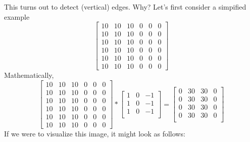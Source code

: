 \documentclass[12pt]{article}
\begin{document}
This turns out to detect (vertical) edges. Why? Let's first consider a simpified example
\begin{equation*}   \begin{bmatrix}
 10 & 10 & 10 & 0 & 0 & 0 \\
 10 & 10 & 10 & 0 & 0 & 0 \\
 10 & 10 & 10 & 0 & 0 & 0 \\
 10 & 10 & 10 & 0 & 0 & 0 \\
 10 & 10 & 10 & 0 & 0 & 0 \\
 10 & 10 & 10 & 0 & 0 & 0
  \end{bmatrix} \end{equation*}
Mathematically,
\begin{equation*}   \begin{bmatrix}
 10 & 10 & 10 & 0 & 0 & 0 \\
 10 & 10 & 10 & 0 & 0 & 0 \\
 10 & 10 & 10 & 0 & 0 & 0 \\
 10 & 10 & 10 & 0 & 0 & 0 \\
 10 & 10 & 10 & 0 & 0 & 0 \\
 10 & 10 & 10 & 0 & 0 & 0
  \end{bmatrix} 
  * 
  \begin{bmatrix}     
    1 & 0 & -1 \\     
    1 & 0 & -1 \\
    1 & 0 & -1 \\
  \end{bmatrix}
  =
  \begin{bmatrix}     0 & 30 & 30 & 0 \\
    0 & 30 & 30 & 0 \\
    0 & 30 & 30 & 0 \\
    0 & 30 & 30 & 0 \\
  \end{bmatrix} \end{equation*}
If we were to visualize this image, it might look as follows:
\end{document}
